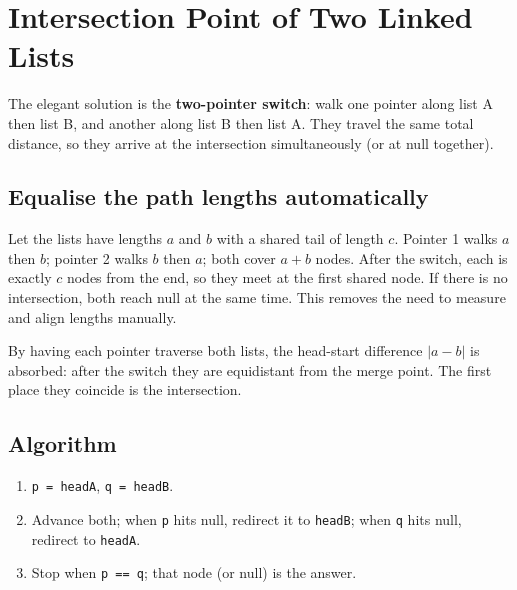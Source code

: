 \section{Intersection Point of Two Linked Lists}
\label{sec:ll-intersection}


\begin{patternbox}
The elegant solution is the \textbf{two-pointer switch}: walk one pointer
along list A then list B, and another along list B then list A. They travel
the same total distance, so they arrive at the intersection simultaneously
(or at null together).
\end{patternbox}

\subsection*{Equalise the path lengths automatically}

Let the lists have lengths $a$ and $b$ with a shared tail of length $c$.
Pointer 1 walks $a$ then $b$; pointer 2 walks $b$ then $a$; both cover
$a+b$ nodes. After the switch, each is exactly $c$ nodes from the end, so
they meet at the first shared node. If there is no intersection, both reach
null at the same time. This removes the need to measure and align lengths
manually.

\begin{ideabox}
By having each pointer traverse both lists, the head-start difference $|a-b|$
is absorbed: after the switch they are equidistant from the merge point. The
first place they coincide is the intersection.
\end{ideabox}

\subsection*{Algorithm}

\begin{enumerate}
  \item \texttt{p = headA}, \texttt{q = headB}.
  \item Advance both; when \texttt{p} hits null, redirect it to
        \texttt{headB}; when \texttt{q} hits null, redirect to
        \texttt{headA}.
  \item Stop when \texttt{p == q}; that node (or null) is the answer.
\end{enumerate}

